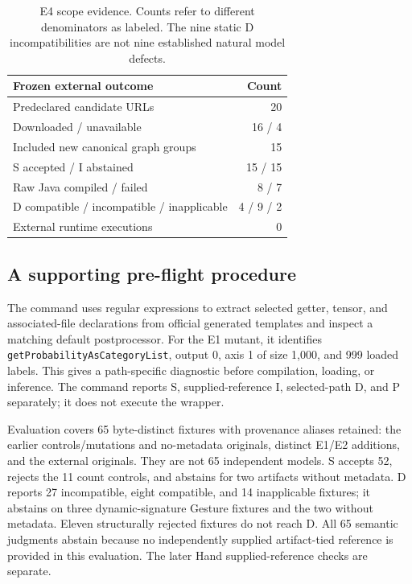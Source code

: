 \documentclass[10pt,twocolumn,letterpaper]{article}
\newcommand{\code}[1]{\texttt{#1}}
\begin{document}
\begin{table}[t]
\centering\small
\begin{tabular}{@{}lr@{}}
\toprule
Frozen external outcome & Count\\
\midrule
Predeclared candidate URLs & 20\\
Downloaded / unavailable & 16 / 4\\
Included new canonical graph groups & 15\\
S accepted / I abstained & 15 / 15\\
Raw Java compiled / failed & 8 / 7\\
D compatible / incompatible / inapplicable & 4 / 9 / 2\\
External runtime executions & 0\\
\bottomrule
\end{tabular}
\caption{E4 scope evidence. Counts refer to different denominators as labeled. The nine static D incompatibilities are not nine established natural model defects.}
\label{tab:external}
\end{table}

\subsection{A supporting pre-flight procedure}
The command uses regular expressions to extract selected getter, tensor, and associated-file declarations from official generated templates and inspect a matching default postprocessor. For the E1 mutant, it identifies \code{getProbabilityAsCategoryList}, output 0, axis 1 of size 1,000, and 999 loaded labels. This gives a path-specific diagnostic before compilation, loading, or inference. The command reports S, supplied-reference I, selected-path D, and P separately; it does not execute the wrapper.

Evaluation covers 65 byte-distinct fixtures with provenance aliases retained: the earlier controls/mutations and no-metadata originals, distinct E1/E2 additions, and the external originals. They are not 65 independent models. S accepts 52, rejects the 11 count controls, and abstains for two artifacts without metadata. D reports 27 incompatible, eight compatible, and 14 inapplicable fixtures; it abstains on three dynamic-signature Gesture fixtures and the two without metadata. Eleven structurally rejected fixtures do not reach D. All 65 semantic judgments abstain because no independently supplied artifact-tied reference is provided in this evaluation. The later Hand supplied-reference checks are separate.
\end{document}
